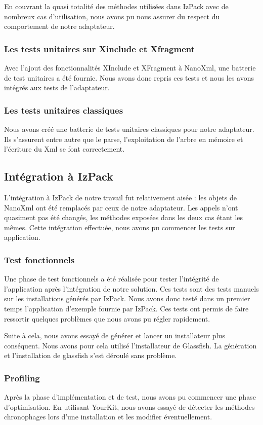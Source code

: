 En couvrant la quasi totalité des méthodes utilisées dans IzPack avec de nombreux cas d'utilisation, nous avons pu nous assurer du respect du comportement de notre adaptateur.

\subsubsection{Les tests unitaires sur Xinclude et Xfragment}
Avec l'ajout des fonctionnalités XInclude et XFragment à NanoXml, une batterie de test unitaires a été fournie.
Nous avons donc repris ces tests et nous les avons intégrés aux tests de l'adaptateur.

\subsubsection{Les tests unitaires classiques}
Nous avons créé une batterie de tests unitaires classiques pour notre adaptateur.
Ils s'assurent entre autre que le parse, l'exploitation de l'arbre en mémoire et l'écriture du Xml se font correctement.

\subsection{Intégration à IzPack}
L'intégration à IzPack de notre travail fut relativement aisée : les objets de NanoXml ont été remplacés par ceux de notre adaptateur.
Les appels n'ont quasiment pas été changés, les méthodes exposées dans les deux cas étant les mêmes.
Cette intégration effectuée, nous avons pu commencer les tests sur application.
\subsubsection{Test fonctionnels}
Une phase de test fonctionnels a été réalisée pour tester l'intégrité de l'application après l'intégration de notre solution.
Ces tests sont des tests manuels sur les installations générés par IzPack.
Nous avons donc testé dans un premier temps l'application d'exemple fournie par IzPack.
Ces tests ont permis de faire ressortir quelques problèmes que nous avons pu régler rapidement.

Suite à cela, nous avons essayé de générer et lancer un installateur plus conséquent.
Nous avons pour cela utilisé l'installateur de Glassfish.
La génération et l'installation de glassfish s'est déroulé sans problème.
\subsubsection{Profiling}
Après la phase d'implémentation et de test, nous avons pu commencer une phase d'optimisation.
En utilisant YourKit, nous avons essayé de détecter les méthodes chronophages lors d'une installation et les modifier éventuellement.

